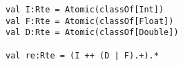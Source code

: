 \begin{lstlisting}[style=scalaioScala]
val I:Rte = Atomic(classOf[Int])
val F:Rte = Atomic(classOf[Float])
val D:Rte = Atomic(classOf[Double])

val re:Rte = (I ++ (D | F).+).*
\end{lstlisting}
